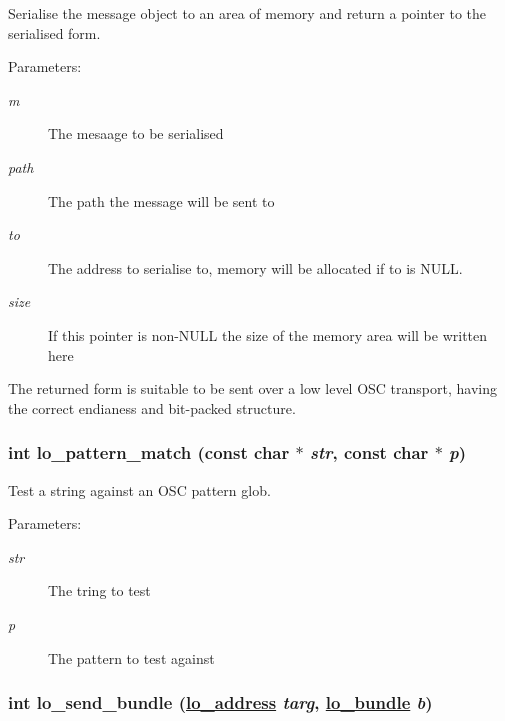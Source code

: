 Serialise the message object to an area of memory and return a pointer to the serialised form. 

\begin{Desc}
\item[Parameters:]
\begin{description}
\item[{\em m}]The mesaage to be serialised \item[{\em path}]The path the message will be sent to \item[{\em to}]The address to serialise to, memory will be allocated if to is NULL. \item[{\em size}]If this pointer is non-NULL the size of the memory area will be written here\end{description}
\end{Desc}
The returned form is suitable to be sent over a low level OSC transport, having the correct endianess and bit-packed structure. \hypertarget{group__liblolowlevel_gc26f3d15dbd23f34d4f9e4f6f0b81bbb}{
\subsubsection[lo\_\-pattern\_\-match]{\setlength{\rightskip}{0pt plus 5cm}int lo\_\-pattern\_\-match (const char $\ast$ {\em str}, const char $\ast$ {\em p})}}
\label{group__liblolowlevel_gc26f3d15dbd23f34d4f9e4f6f0b81bbb}


Test a string against an OSC pattern glob. 

\begin{Desc}
\item[Parameters:]
\begin{description}
\item[{\em str}]The tring to test \item[{\em p}]The pattern to test against \end{description}
\end{Desc}
\hypertarget{group__liblolowlevel_gd1138d0f777693ae0321e3da65aee53e}{
\subsubsection[lo\_\-send\_\-bundle]{\setlength{\rightskip}{0pt plus 5cm}int lo\_\-send\_\-bundle (\hyperlink{lo__types_8h_bf9b53223467de596b89e1377b0f3f3d}{lo\_\-address} {\em targ}, \hyperlink{lo__types_8h_96254950ad34e9cfbf8a6613fc74025b}{lo\_\-bundle} {\em b})}}
\label{group__liblolowlevel_gd1138d0f777693ae0321e3da65aee53e}


